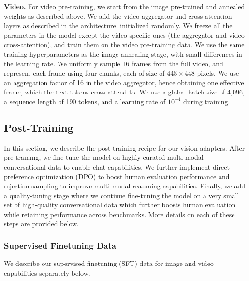 \documentclass[dvipsnames]{fairmeta}
\begin{document}
\textbf{Video.}
For video pre-training, we start from the image pre-trained and annealed weights as described above.
We add the video aggregator and cross-attention layers as described in the architecture, initialized randomly. We freeze all the parameters in the model except the video-specific ones (the aggregator and video cross-attention), and train them on the video pre-training data.
We use the same training hyperparameters as the image annealing stage, with small differences in the learning rate.
We uniformly sample 16 frames from the full video, and represent each frame using four chunks, each of size of $448 \times 448$ pixels.
We use an aggregation factor of 16 in the video aggregator, hence obtaining one effective frame, which the text tokens cross-attend to.
We use a global batch size of 4,096, a sequence length of 190 tokens, and a learning rate of $10^{-4}$ during training.

\subsection{Post-Training}
\label{section:vision_post_training}
In this section, we describe the post-training recipe for our vision adapters. After pre-training, we fine-tune the model on highly curated multi-modal conversational data to enable chat capabilities. We further implement direct preference optimization (DPO) to boost human evaluation performance and rejection sampling to improve multi-modal reasoning capabilities. Finally, we add a quality-tuning stage where we continue fine-tuning the model on a very small set of high-quality conversational data which further boosts human evaluation while retaining performance across benchmarks. More details on each of these steps are provided below.

\subsubsection{Supervised Finetuning Data}
\label{subsubsection:vision_supervised_finetuning_data}
We describe our supervised finetuning (SFT) data for image and video capabilities separately below.
\end{document}
